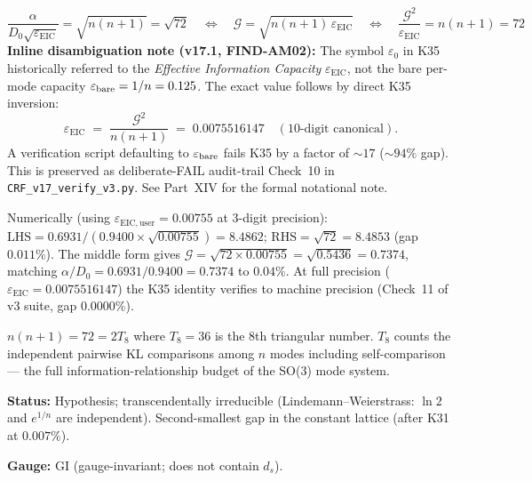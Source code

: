\documentclass[12pt, a4paper]{article}
\begin{document}
\begin{keybox}[title={Identity K35 (gap $0.011\%$, Hypothesis) --- v17.1 disambiguated}]
\[
  \boxed{\frac{\alpha}{D_0\sqrt{\varepsilon_{\mathrm{EIC}}}} = \sqrt{n(n+1)} = \sqrt{72}}
  \quad\Leftrightarrow\quad
  \boxed{\mathcal{G} = \sqrt{n(n+1)\,\varepsilon_{\mathrm{EIC}}}}
  \quad\Leftrightarrow\quad
  \boxed{\frac{\mathcal{G}^2}{\varepsilon_{\mathrm{EIC}}} = n(n+1) = 72}
\]
\textbf{Inline disambiguation note (v17.1, FIND-AM02):}
The symbol $\varepsilon_0$ in K35 historically referred to the
\emph{Effective Information Capacity} $\varepsilon_{\mathrm{EIC}}$, not
the bare per-mode capacity $\varepsilon_{\rm bare} = 1/n = 0.125$.
The exact value follows by direct K35 inversion:
\[
  \varepsilon_{\mathrm{EIC}} \;=\; \frac{\mathcal{G}^2}{n(n+1)}
  \;=\; 0.0075516147 \quad (10\text{-digit canonical}).
\]
A verification script defaulting to $\varepsilon_{\rm bare}$ fails K35 by
a factor of $\sim 17$ ($\sim 94\%$ gap). This is preserved as
deliberate-FAIL audit-trail Check~10 in
\texttt{CRF\_v17\_verify\_v3.py}. See Part~XIV for the formal
notational note.

\medskip
Numerically (using $\varepsilon_{\mathrm{EIC,user}} = 0.00755$ at 3-digit precision):
$\mathrm{LHS} = 0.6931/(0.9400\times\sqrt{0.00755}) = 8.4862$;
$\mathrm{RHS} = \sqrt{72} = 8.4853$ (gap $0.011\%$).
The middle form gives $\mathcal{G} = \sqrt{72\times 0.00755} = \sqrt{0.5436} = 0.7374$,
matching $\alpha/D_0 = 0.6931/0.9400 = 0.7374$ to $0.04\%$.
At full precision ($\varepsilon_{\mathrm{EIC}} = 0.0075516147$) the K35
identity verifies to machine precision (Check~11 of v3 suite,
gap $0.0000\%$).

\medskip
$n(n+1) = 72 = 2T_8$ where $T_8 = 36$ is the 8th triangular number.
$T_8$ counts the independent pairwise KL comparisons among $n$ modes
including self-comparison --- the full information-relationship budget of the SO(3) mode system.

\textbf{Status:} Hypothesis; transcendentally irreducible (Lindemann--Weierstrass:
$\ln 2$ and $e^{1/n}$ are independent). Second-smallest gap in the constant lattice (after K31 at $0.007\%$).

\textbf{Gauge:} GI (gauge-invariant; does not contain $d_s$).
\end{keybox}
\end{document}
